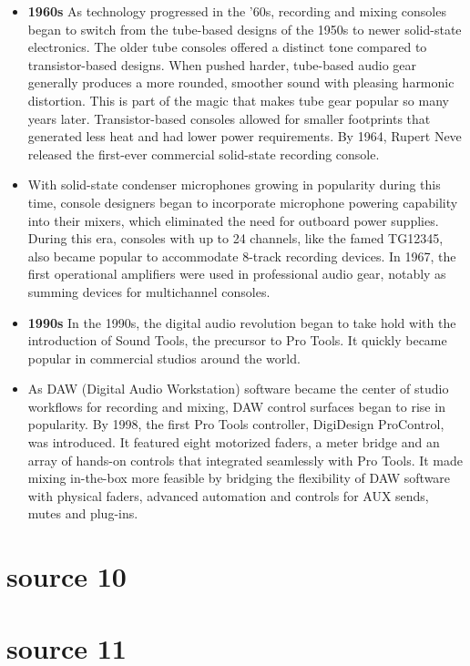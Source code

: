 \documentclass[12pt]{article}
\begin{document}
\begin{itemize}
            \item \textbf{1960s} As technology progressed in the '60s, recording and mixing consoles began to switch from the tube-based designs of the 1950s to newer solid-state electronics. The older tube consoles offered a distinct tone compared to transistor-based designs. When pushed harder, tube-based audio gear generally produces a more rounded, smoother sound with pleasing harmonic distortion. This is part of the magic that makes tube gear popular so many years later. Transistor-based consoles allowed for smaller footprints that generated less heat and had lower power requirements. By 1964, Rupert Neve released the first-ever commercial solid-state recording console.
            \item With solid-state condenser microphones growing in popularity during this time, console designers began to incorporate microphone powering capability into their mixers, which eliminated the need for outboard power supplies. During this era, consoles with up to 24 channels, like the famed TG12345, also became popular to accommodate 8-track recording devices. In 1967, the first operational amplifiers were used in professional audio gear, notably as summing devices for multichannel consoles.
            \item \textbf{1990s} In the 1990s, the digital audio revolution began to take hold with the introduction of Sound Tools, the precursor to Pro Tools. It quickly became popular in commercial studios around the world.
            \item As DAW (Digital Audio Workstation) software became the center of studio workflows for recording and mixing, DAW control surfaces began to rise in popularity. By 1998, the first Pro Tools controller, DigiDesign ProControl, was introduced. It featured eight motorized faders, a meter bridge and an array of hands-on controls that integrated seamlessly with Pro Tools. It made mixing in-the-box more feasible by bridging the flexibility of DAW software with physical faders, advanced automation and controls for AUX sends, mutes and plug-ins.
        \end{itemize}
    \newpage
    \section{source 10 \autocite{smithWayWeWere2018}}
    \section{source 11 \autocite{smithWayWeWere2018a}}
\end{document}
